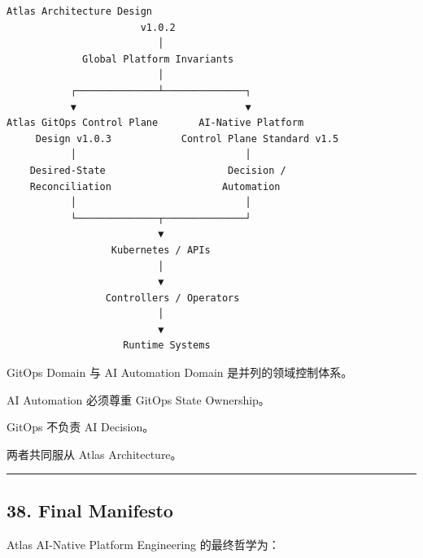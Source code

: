 \documentclass[11pt,a4paper]{article}
\begin{document}
\begin{lstlisting}[language=text]
                Atlas Architecture Design
                       v1.0.2
                          │
             Global Platform Invariants
                          │
           ┌──────────────┴──────────────┐
           ▼                             ▼
Atlas GitOps Control Plane       AI-Native Platform
     Design v1.0.3            Control Plane Standard v1.5
           │                             │
    Desired-State                     Decision /
    Reconciliation                   Automation
           │                             │
           └──────────────┬──────────────┘
                          ▼
                  Kubernetes / APIs
                          │
                          ▼
                 Controllers / Operators
                          │
                          ▼
                    Runtime Systems
\end{lstlisting}
GitOps Domain 与 AI Automation Domain 是并列的领域控制体系。

AI Automation 必须尊重 GitOps State Ownership。

GitOps 不负责 AI Decision。

两者共同服从 Atlas Architecture。

\vspace{0.5em}\hrule\vspace{0.5em}
\subsection{38. Final Manifesto}
Atlas AI-Native Platform Engineering 的最终哲学为：
\end{document}
